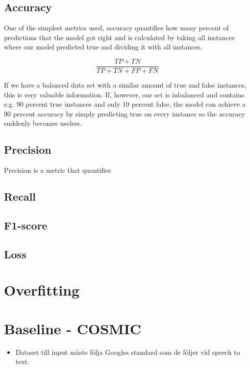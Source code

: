 \documentclass[nofilelist]{cslthse-msc}
\begin{document}
\subsection{Accuracy}
One of the simplest metrics used, accuracy quantifies how many percent of predictions that the model got right and is calculated by taking all instances where our model predicted true and dividing it with all instances.

$$\frac{TP + TN}{TP + TN + FP + FN}$$

If we have a balanced data set with a similar amount of true and false instances, this is very valuable information. If, however, our set is inbalanced and contains e.g. 90 percent true instances and only 10 percent false, the model can achieve a 90 percent accuracy by simply predicting true on every instance so the accuracy suddenly becomes useless. 

\subsection{Precision}
Precision is a metric that quantifies 

\subsection{Recall}

\subsection{F1-score}


\subsection{Loss}

\section{Overfitting}





\section{Baseline - COSMIC}
\begin{itemize}
    \item Dataset till input måste följa Googles standard som de följer vid speech to text. 
\end{itemize}
\end{document}
